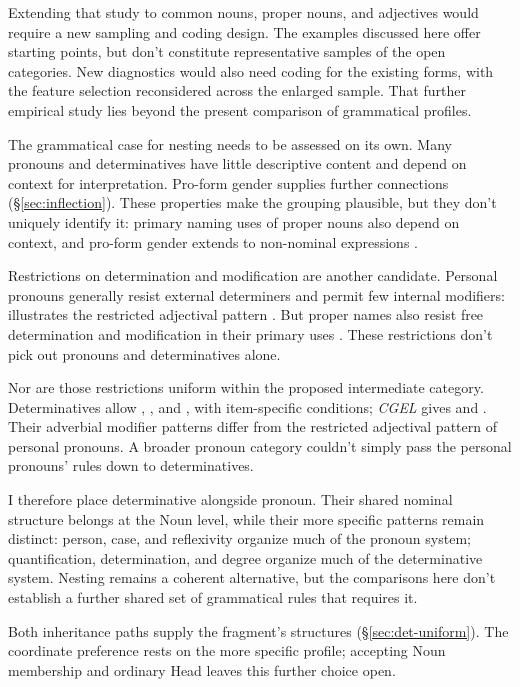 \documentclass[12pt]{article}
\begin{document}
Extending that study to common nouns, proper nouns, and adjectives would require a new sampling and coding design. The examples discussed here offer starting points, but don't constitute representative samples of the open categories. New diagnostics would also need coding for the existing forms, with the feature selection reconsidered across the enlarged sample. That further empirical study lies beyond the present comparison of grammatical profiles.

The grammatical case for nesting needs to be assessed on its own. Many pronouns and determinatives have little descriptive content and depend on context for interpretation. Pro-form gender supplies further connections (§\ref{sec:inflection}). These properties make the grouping plausible, but they don't uniquely identify it: primary naming uses of proper nouns also depend on context, and pro-form gender extends to non-nominal expressions \citep{reynolds2025proformgender}.

Restrictions on determination and modification are another candidate. Personal pronouns generally resist external determiners and permit few internal modifiers:  illustrates the restricted adjectival pattern \citep[429--430]{huddleston2002}. But proper names also resist free determination and modification in their primary uses \citep[517, 519--520]{huddleston2002}. These restrictions don't pick out pronouns and determinatives alone.

Nor are those restrictions uniform within the proposed intermediate category. Determinatives allow , , and , with item-specific conditions; \textit{CGEL} gives  and  \citep[415--416]{huddleston2002}. Their adverbial modifier patterns differ from the restricted adjectival pattern of personal pronouns. A broader pronoun category couldn't simply pass the personal pronouns' rules down to determinatives.

I therefore place determinative alongside pronoun. Their shared nominal structure belongs at the Noun level, while their more specific patterns remain distinct: person, case, and reflexivity organize much of the pronoun system; quantification, determination, and degree organize much of the determinative system. Nesting remains a coherent alternative, but the comparisons here don't establish a further shared set of grammatical rules that requires it.

Both inheritance paths supply the fragment's structures (§\ref{sec:det-uniform}). The coordinate preference rests on the more specific profile; accepting Noun membership and ordinary Head leaves this further choice open.
\end{document}
